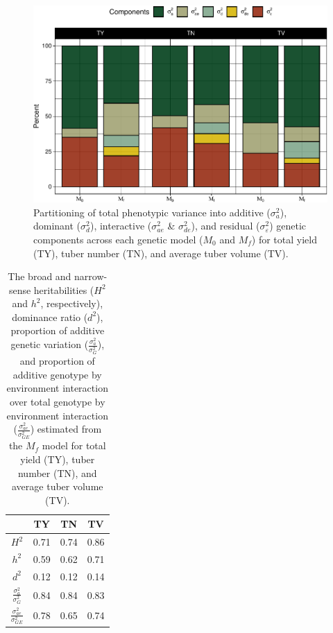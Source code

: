         \begin{figure}
        \centering
        \includegraphics[width=\linewidth]{./figs_02/Fig4.pdf}
        \caption{\label{fig:plot-var}Partitioning of total phenotypic variance into additive (\(\sigma^2_a\)), dominant (\(\sigma^2_d\)), interactive (\(\sigma^2_{ae}\) \& \(\sigma^2_{de}\)), and residual (\(\sigma^2_\varepsilon\)) genetic components across each genetic model (\(M_0\) and \(M_f\)) for total yield (TY), tuber number (TN), and average tuber volume (TV).}
        \end{figure}

        \begin{table}

        \caption{\label{tab:ratio-tab}The broad and narrow-sense heritabilities ($H^2$ and $h^2$, respectively), dominance ratio ($d^2$), proportion of additive genetic variation ($\frac{\sigma^2_a}{\sigma^2_G}$), and proportion of additive genotype by environment interaction over total genotype by environment interaction ($\frac{\sigma^2_{ae}}{\sigma^2_{GE}}$) estimated from the $M_f$ model for total yield (TY), tuber number (TN), and average tuber volume (TV).}
\centering
\begin{tabular}[t]{cccc}
\toprule
 & TY & TN & TV\\
\midrule
$H^2$ & 0.71 & 0.74 & 0.86\\
$h^2$ & 0.59 & 0.62 & 0.71\\
$d^2$ & 0.12 & 0.12 & 0.14\\
$\frac{\sigma^2_{a}}{\sigma^2_G}$ & 0.84 & 0.84 & 0.83\\
$\frac{\sigma^2_{ae}}{\sigma^2_{GE}}$ & 0.78 & 0.65 & 0.74\\
\bottomrule
\end{tabular}
\end{table}

